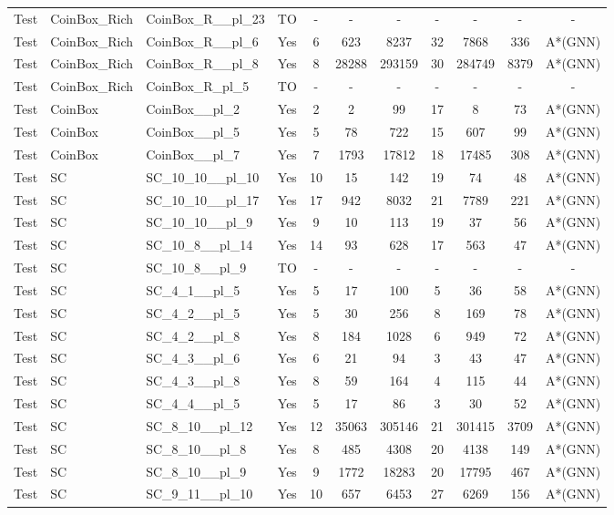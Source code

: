 \documentclass{article}
\begin{document}
\begin{tabular}{lllcccccccc}
Test & CoinBox\_Rich & CoinBox\_R\_\_pl\_23 & TO & - & - & - & - & - & - & - \\
Test & CoinBox\_Rich & CoinBox\_R\_\_pl\_6 & Yes & 6 & 623 & 8237 & 32 & 7868 & 336 & A*(GNN) \\
Test & CoinBox\_Rich & CoinBox\_R\_\_pl\_8 & Yes & 8 & 28288 & 293159 & 30 & 284749 & 8379 & A*(GNN) \\
Test & CoinBox\_Rich & CoinBox\_R\_pl\_5 & TO & - & - & - & - & - & - & - \\
Test & CoinBox & CoinBox\_\_pl\_2 & Yes & 2 & 2 & 99 & 17 & 8 & 73 & A*(GNN) \\
Test & CoinBox & CoinBox\_\_pl\_5 & Yes & 5 & 78 & 722 & 15 & 607 & 99 & A*(GNN) \\
Test & CoinBox & CoinBox\_\_pl\_7 & Yes & 7 & 1793 & 17812 & 18 & 17485 & 308 & A*(GNN) \\
Test & SC & SC\_10\_10\_\_pl\_10 & Yes & 10 & 15 & 142 & 19 & 74 & 48 & A*(GNN) \\
Test & SC & SC\_10\_10\_\_pl\_17 & Yes & 17 & 942 & 8032 & 21 & 7789 & 221 & A*(GNN) \\
Test & SC & SC\_10\_10\_\_pl\_9 & Yes & 9 & 10 & 113 & 19 & 37 & 56 & A*(GNN) \\
Test & SC & SC\_10\_8\_\_pl\_14 & Yes & 14 & 93 & 628 & 17 & 563 & 47 & A*(GNN) \\
Test & SC & SC\_10\_8\_\_pl\_9 & TO & - & - & - & - & - & - & - \\
Test & SC & SC\_4\_1\_\_pl\_5 & Yes & 5 & 17 & 100 & 5 & 36 & 58 & A*(GNN) \\
Test & SC & SC\_4\_2\_\_pl\_5 & Yes & 5 & 30 & 256 & 8 & 169 & 78 & A*(GNN) \\
Test & SC & SC\_4\_2\_\_pl\_8 & Yes & 8 & 184 & 1028 & 6 & 949 & 72 & A*(GNN) \\
Test & SC & SC\_4\_3\_\_pl\_6 & Yes & 6 & 21 & 94 & 3 & 43 & 47 & A*(GNN) \\
Test & SC & SC\_4\_3\_\_pl\_8 & Yes & 8 & 59 & 164 & 4 & 115 & 44 & A*(GNN) \\
Test & SC & SC\_4\_4\_\_pl\_5 & Yes & 5 & 17 & 86 & 3 & 30 & 52 & A*(GNN) \\
Test & SC & SC\_8\_10\_\_pl\_12 & Yes & 12 & 35063 & 305146 & 21 & 301415 & 3709 & A*(GNN) \\
Test & SC & SC\_8\_10\_\_pl\_8 & Yes & 8 & 485 & 4308 & 20 & 4138 & 149 & A*(GNN) \\
Test & SC & SC\_8\_10\_\_pl\_9 & Yes & 9 & 1772 & 18283 & 20 & 17795 & 467 & A*(GNN) \\
Test & SC & SC\_9\_11\_\_pl\_10 & Yes & 10 & 657 & 6453 & 27 & 6269 & 156 & A*(GNN) \\

\end{tabular}
\end{document}
